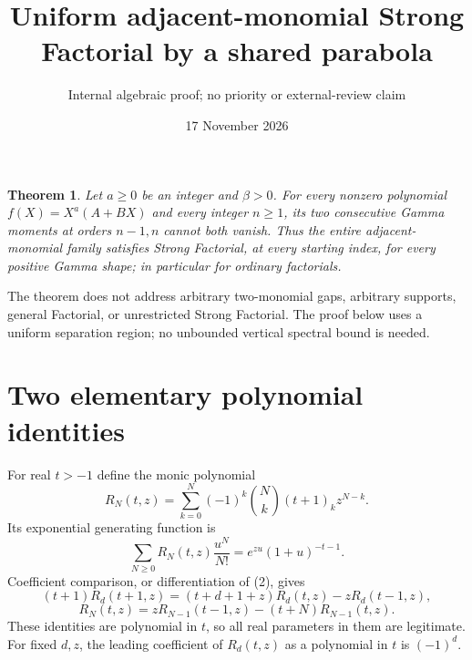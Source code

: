 \documentclass[11pt]{article}
\title{Uniform adjacent-monomial Strong Factorial by a shared parabola}
\author{Internal algebraic proof; no priority or external-review claim}
\date{17 November 2026}
\newtheorem{theorem}{Theorem}
\begin{document}
\maketitle
\begin{theorem}\label{thm:main}
Let $a\ge0$ be an integer and $\beta>0$. For every nonzero polynomial
$f(X)=X^a(A+BX)$ and every integer $n\ge1$, its two consecutive
Gamma moments at orders $n-1,n$ cannot both vanish. Thus the entire
adjacent-monomial family satisfies Strong Factorial, at every starting
index, for every positive Gamma shape; in particular for ordinary factorials.
\end{theorem}
The theorem does not address arbitrary two-monomial gaps, arbitrary
supports, general Factorial, or unrestricted Strong Factorial.
The proof below uses a uniform separation region; no unbounded vertical spectral bound is needed.

\section{Two elementary polynomial identities}
For real $t>-1$ define the monic polynomial
\[
 R_N(t,z)=\sum_{k=0}^N(-1)^k\binom Nk(t+1)_k z^{N-k}.
                                                               \tag{1}
\]
Its exponential generating function is
\[
 \sum_{N\ge0}R_N(t,z)\frac{u^N}{N!}
                         =e^{zu}(1+u)^{-t-1}.                  \tag{2}
\]
Coefficient comparison, or differentiation of (2), gives
\[
 (t+1)R_d(t+1,z)=(t+d+1+z)R_d(t,z)-zR_d(t-1,z),              \tag{3}
\]
\[
 R_N(t,z)=zR_{N-1}(t-1,z)-(t+N)R_{N-1}(t,z).                \tag{4}
\]
These identities are polynomial in $t$, so all real parameters in them
are legitimate. For fixed $d,z$, the leading coefficient of $R_d(t,z)$
as a polynomial in $t$ is $(-1)^d$.
\end{document}
